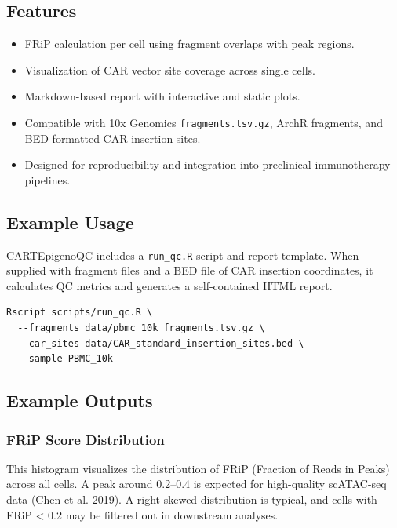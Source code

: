 \documentclass[
]{article}
\providecommand{\tightlist}{%
  \setlength{\itemsep}{0pt}\setlength{\parskip}{0pt}}
\begin{document}
\subsection{Features}\label{features}

\begin{itemize}
\tightlist
\item
  FRiP calculation per cell using fragment overlaps with peak regions.
\item
  Visualization of CAR vector site coverage across single cells.
\item
  Markdown-based report with interactive and static plots.
\item
  Compatible with 10x Genomics \texttt{fragments.tsv.gz}, ArchR
  fragments, and BED-formatted CAR insertion sites.
\item
  Designed for reproducibility and integration into preclinical
  immunotherapy pipelines.
\end{itemize}

\subsection{Example Usage}\label{example-usage}

CARTEpigenoQC includes a \texttt{run\_qc.R} script and report template.
When supplied with fragment files and a BED file of CAR insertion
coordinates, it calculates QC metrics and generates a self-contained
HTML report.

\begin{verbatim}
Rscript scripts/run_qc.R \
  --fragments data/pbmc_10k_fragments.tsv.gz \
  --car_sites data/CAR_standard_insertion_sites.bed \
  --sample PBMC_10k
\end{verbatim}

\subsection{Example Outputs}\label{example-outputs}

\subsubsection{FRiP Score Distribution}\label{frip-score-distribution}

This histogram visualizes the distribution of FRiP (Fraction of Reads in
Peaks) across all cells. A peak around 0.2--0.4 is expected for
high-quality scATAC-seq data (Chen et al. 2019). A right-skewed
distribution is typical, and cells with FRiP \textless{} 0.2 may be
filtered out in downstream analyses.
\end{document}

